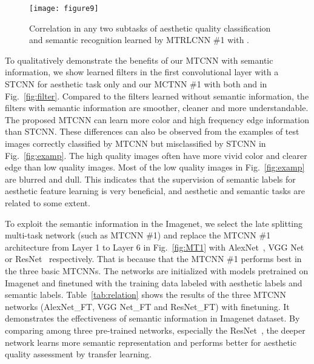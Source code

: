 \documentclass[journal]{IEEEtran}
\begin{document}
\begin{figure}
  \centering
\texttt{[image: figure9]} \\
\caption{Correlation in any two subtasks of aesthetic quality classification and semantic recognition learned by MTRLCNN \#1 with .}
  \label{fig:corr}
\end{figure}
To qualitatively demonstrate the benefits of our MTCNN with semantic information, we show learned filters in the first convolutional layer with a STCNN for aesthetic task only and our MCTNN \#1 with both  and  in Fig.~\ref{fig:filter}. Compared to the filters learned without semantic information, the filters with semantic information are smoother, cleaner and more understandable. The proposed MTCNN can learn more color and high frequency edge information than STCNN. These differences can also be observed from the examples of test images correctly classified by MTCNN but misclassified by STCNN in Fig.~\ref{fig:examp}. The high quality images often have more vivid color and clearer edge than low quality images. Most of the low quality images in Fig.~\ref{fig:examp} are blurred and dull. This indicates that the supervision of semantic labels for aesthetic feature learning is very beneficial, and aesthetic and semantic tasks are related to some extent.


To exploit the semantic information in the Imagenet, we select the late splitting multi-task network (such as MTCNN \#1) and replace the MTCNN \#1 architecture from Layer 1 to Layer 6 in Fig.~\ref{fig:MT1} with AlexNet~\cite{ Krizhevsky12}, VGG Net~\cite{Simonyan14c} or ResNet~\cite{He2015} respectively. That is because that the MTCNN \#1 performs best in the three basic MTCNNs. The networks are initialized with models pretrained on Imagenet and finetuned with the training data labeled with aesthetic labels and semantic labels. Table~\ref{tab:relation} shows the results of the three MTCNN networks (AlexNet\_FT, VGG Net\_FT and ResNet\_FT) with finetuning. It demonstrates the effectiveness of semantic information in Imagenet dataset. By comparing among three pre-trained networks, especially the ResNet~\cite{He2015}, the deeper network learns more semantic representation and performs better for aesthetic quality assessment by transfer learning.
\end{document}
